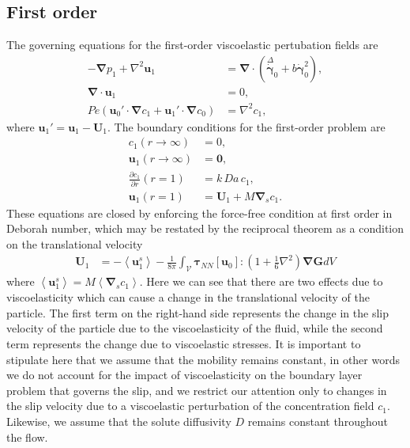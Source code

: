 \documentclass[aps,pre,reprint,twocolumn,notitlepage,superscriptaddress]{revtex4-1}
\begin{document}
\subsection{First order}
The governing equations for the first-order viscoelastic pertubation fields are
\begin{align}
-\boldsymbol{\nabla} p_1 +\nabla^2\boldsymbol{u}_1 &= \boldsymbol{\nabla} \cdot \left(\overset{\Delta}{\dot{\boldsymbol{\gamma}}}_{0}+b\dot{\boldsymbol{\gamma}}^{2}_{0}\right),\label{velSof}\\
\boldsymbol{\nabla} \cdot \boldsymbol{u}_{1} &= 0,\label{massSof}\\
Pe\left(\boldsymbol{u}_{0}' \cdot \boldsymbol{\nabla} c_{1}+\boldsymbol{u}_{1}' \cdot \boldsymbol{\nabla} c_{0}\right) &= \nabla^{2} c_{1},\label{cSof}
\end{align}
where $\boldsymbol{u}_{1}'=\boldsymbol{u}_{1}-\boldsymbol{U}_{1}$. The boundary conditions for the first-order problem are
\begin{align}
c_{1}(r\longrightarrow \infty)&=0,\\
\boldsymbol{u}_{1}(r\longrightarrow \infty) &= \boldsymbol{0},\\
\frac{\partial c_{1}}{\partial r}(r=1) &= k\,Da\,c_{1},\label{conbcSof}\\
\boldsymbol{u}_{1}(r=1) &= \boldsymbol{U}_1+M\boldsymbol{\nabla}_s c_{1}.\label{cocbSof}
\end{align}
These equations are closed by enforcing the force-free condition at first order in Deborah number, which may be restated by the reciprocal theorem as a condition on the translational velocity
\begin{align}\label{Usof}
\boldsymbol{U}_{1}&=-\left\langle\boldsymbol{u}_1^{s}\right\rangle - \frac{1}{8\pi}\int_{\mathcal{V}}\boldsymbol{\tau}_{NN}[\boldsymbol{u}_0] :\left(1+\frac{1}{6}\nabla^2\right)\boldsymbol{\nabla}\boldsymbol{G} d V
\end{align}
where $\left\langle\boldsymbol{u}_1^{s}\right\rangle = M\left\langle \boldsymbol{\nabla}_s c_{1} \right\rangle$. Here we can see that there are two effects due to viscoelasticity which can cause a change in the translational velocity of the particle. The first term on the right-hand side represents the change in the slip velocity of the particle due to the viscoelasticity of the fluid, while the second term represents the change due to viscoelastic stresses. It is important to stipulate here that we assume that the mobility remains constant, in other words we do not account for the impact of viscoelasticity on the boundary layer problem that governs the slip, and we restrict our attention only to changes in the slip velocity due to a viscoelastic perturbation of the concentration field $c_1$. Likewise, we assume that the solute diffusivity $D$ remains constant throughout the flow.
\end{document}
